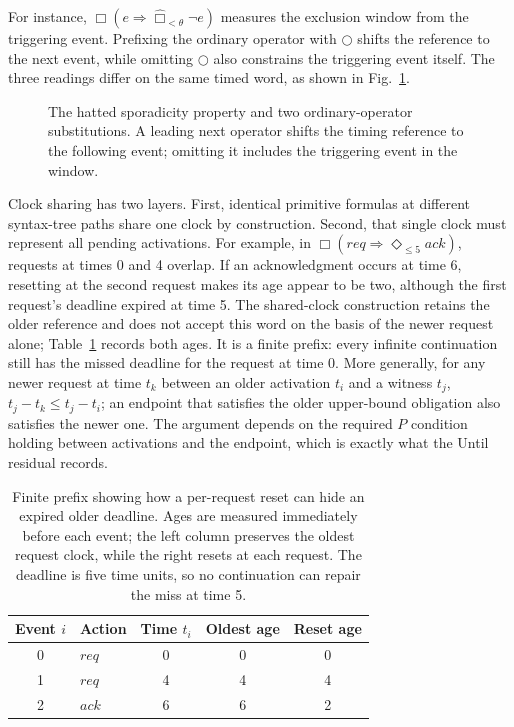 \documentclass[10pt,journal,compsoc]{IEEEtran}
\begin{document}
For instance, $\Box(e\Rightarrow\widehat{\Box}_{<\theta}\neg e)$ measures
the exclusion window from the triggering event. Prefixing the ordinary
operator with $\bigcirc$ shifts the reference to the next event, while
omitting $\bigcirc$ also constrains the triggering event itself. The three
readings differ on the same timed word, as shown in Fig.~\ref{fig:hat-reference}.
\begin{figure}[t]
\centering

\caption{The hatted sporadicity property and two ordinary-operator
substitutions. A leading next operator shifts the timing reference to the
following event; omitting it includes the triggering event in the window.}
\label{fig:hat-reference}
\end{figure}

Clock sharing has two layers. First, identical primitive formulas at
different syntax-tree paths share one clock by construction. Second, that
single clock must represent all pending activations. For example, in
$\Box(\mathit{req}\Rightarrow\Diamond_{\le5}\mathit{ack})$, requests at times
0 and 4 overlap. If an acknowledgment occurs at time 6, resetting at the
second request makes its age appear to be two, although the first request's
deadline expired at time 5. The shared-clock construction retains the older
reference and does not accept this word on the basis of the newer request
alone; Table~\ref{tab:overlap-example} records both ages. It is a finite
prefix: every infinite continuation still has the missed deadline for the
request at time 0. More generally, for
any newer request at time $t_k$ between an older activation $t_i$ and a
witness $t_j$, $t_j-t_k\le t_j-t_i$; an endpoint that satisfies the older
upper-bound obligation also satisfies the newer one. The argument depends on
the required $P$ condition holding between activations and the endpoint,
which is exactly what the Until residual records.

\begin{table}[t]
\centering
\caption{Finite prefix showing how a per-request reset can hide an expired
older deadline. Ages are measured immediately before each event; the left
column preserves the oldest request clock, while the right resets at each
request. The deadline is five time units, so no continuation can repair the
miss at time 5.}
\label{tab:overlap-example}
\footnotesize
\begin{tabular}{@{}clccc@{}}
\toprule
Event $i$ & Action & Time $t_i$ & Oldest age & Reset age\\
\midrule
0 & $\mathit{req}$ & 0 & 0 & 0\\
1 & $\mathit{req}$ & 4 & 4 & 4\\
2 & $\mathit{ack}$ & 6 & 6 & 2\\
\bottomrule
\end{tabular}
\end{table}
\end{document}

